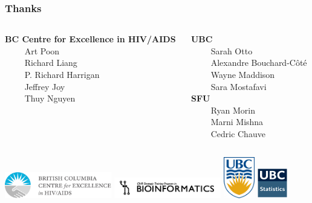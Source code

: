\documentclass{beamer}
\begin{document}
\begin{frame}
    \frametitle{Thanks}
    \begin{columns}
        \begin{column}{0.5\textwidth}
            \textbf{BC Centre for Excellence in HIV/AIDS} \\
            $\qquad$ Art Poon \\
            $\qquad$ Richard Liang \\
            $\qquad$ P. Richard Harrigan \\
            $\qquad$ Jeffrey Joy \\
            $\qquad$ Thuy Nguyen
        \end{column}
        \begin{column}{0.5\textwidth}
            \textbf{UBC} \\
            $\qquad$ Sarah Otto \\
            $\qquad$ Alexandre Bouchard-C\^ot\'e \\
            $\qquad$ Wayne Maddison \\
            $\qquad$ Sara Mostafavi \\
            \textbf{SFU} \\
            $\qquad$ Ryan Morin \\
            $\qquad$ Marni Mishna \\
            $\qquad$ Cedric Chauve
        \end{column}
    \end{columns}

    \vspace{1cm}
    \includegraphics[width=0.35\textwidth]{cfe}
    \includegraphics[width=0.35\textwidth]{btp}
    \includegraphics[width=0.1\textwidth]{ubc}
    \hspace{0.5cm}
    \includegraphics[width=0.1\textwidth]{ubcstats}
\end{frame}
\end{document}
